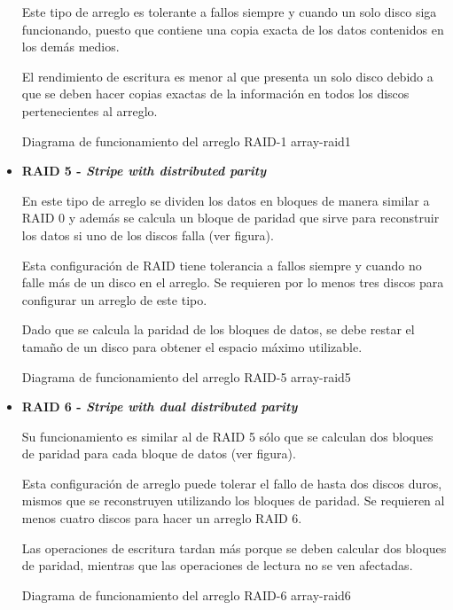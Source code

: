 \begin{itemize}
Este tipo de arreglo es tolerante a fallos siempre y cuando un solo disco siga funcionando, puesto que contiene una copia exacta de los datos contenidos en los dem\'{a}s medios.

El rendimiento de escritura es menor al que presenta un solo disco debido a que se deben hacer copias exactas de la informaci\'{o}n en todos los discos pertenecientes al arreglo.

\diagramblock
{Diagrama de funcionamiento del arreglo \textsc{RAID-1}}
{array-raid1}
{
 {
  
 }
}
\newpage
  \item \textbf{RAID 5 - \textit{Stripe with distributed parity}}

En este tipo de arreglo se dividen los datos en bloques de manera similar a \textsc{\gls{RAID}} 0 y adem\'{a}s se calcula un bloque de paridad que sirve para reconstruir los datos si uno de los discos falla (ver figura).

Esta configuraci\'{o}n de \textsc{\gls{RAID}} tiene tolerancia a fallos siempre y cuando no falle m\'{a}s de un disco en el arreglo. Se requieren por lo menos tres discos para configurar un arreglo de este tipo.

Dado que se calcula la paridad de los bloques de datos, se debe restar el tama\~{n}o de un disco para obtener el espacio m\'{a}ximo utilizable.

\diagramblock
{Diagrama de funcionamiento del arreglo \textsc{RAID-5}}
{array-raid5}
{
 {
  
 }
}
\newpage
  \item \textbf{RAID 6 - \textit{Stripe with \textsl{dual} distributed parity}}

Su funcionamiento es similar al de \textsc{\gls{RAID}} 5 s\'{o}lo que se calculan dos bloques de paridad para cada bloque de datos (ver figura).

Esta configuraci\'{o}n de arreglo puede tolerar el fallo de hasta dos discos duros, mismos que se reconstruyen utilizando los bloques de paridad. Se requieren al menos cuatro discos para hacer un arreglo \textsc{\gls{RAID}} 6.

Las operaciones de escritura tardan m\'{a}s porque se deben calcular dos bloques de paridad, mientras que las operaciones de lectura no se ven afectadas.

\diagramblock
{Diagrama de funcionamiento del arreglo \textsc{RAID-6}}
{array-raid6}
{
 {
  
 }
}

\end{itemize}


